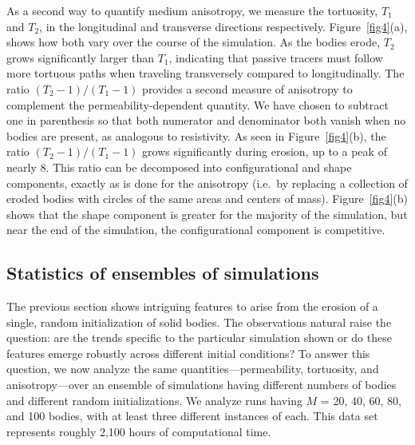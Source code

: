 \documentclass[3p]{elsarticle}
\begin{document}
As a second way to quantify medium anisotropy, we measure the
tortuosity, $T_1$ and $T_2$, in the longitudinal and transverse
directions respectively. Figure~\ref{fig4}(a), shows how both vary over
the course of the simulation. As the bodies erode, $T_2$ grows
significantly larger than $T_1$, indicating that passive tracers must
follow more tortuous paths when traveling transversely compared to longitudinally. The ratio $(T_2-1)/(T_1-1)$ provides
a second measure of anisotropy to complement the permeability-dependent
quantity. We have chosen to subtract one in parenthesis so that both
numerator and denominator both vanish when no bodies are present, as
analogous to resistivity. As seen in Figure~\ref{fig4}(b), the ratio $(T_2-1)/(T_1-1)$ grows significantly during erosion, up to a peak of nearly 8. This ratio can be decomposed into configurational and shape components, exactly as is done for the anisotropy (i.e.~by replacing a collection of eroded bodies with circles of the same areas and centers of mass). Figure~\ref{fig4}(b) shows that the shape component is greater for the majority of the simulation, but near the end of the simulation, the configurational component is competitive. 


\subsection{Statistics of ensembles of simulations}

The previous section shows intriguing features to arise from the erosion of a single, random initialization of solid bodies. The observations natural raise the question: are the trends specific to the particular simulation shown or do these features emerge robustly across different initial conditions? To answer this question, we now analyze the same quantities---permeability, tortuosity, and anisotropy---over an ensemble of simulations having different numbers of bodies and different random initializations. We analyze runs having $M$ = 20, 40, 60, 80, and 100 bodies, with at least three different instances of each. This data set represents roughly 2,100 hours of computational time.  
\end{document}
